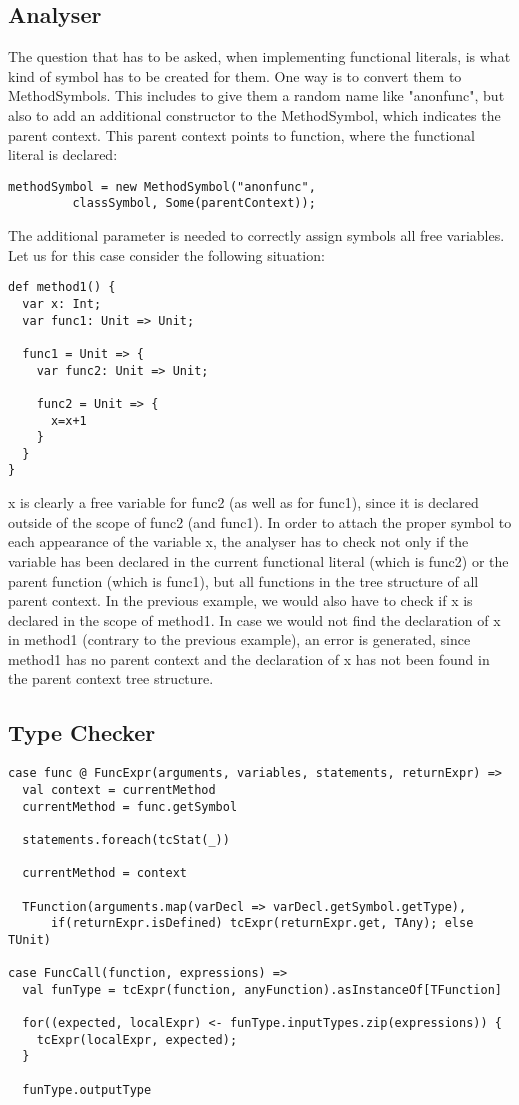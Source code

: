 \subsection{Analyser}
The question that has to be asked, when implementing functional literals, is what kind of symbol has to be created for them. One way is to convert them to MethodSymbols. This includes to give them a random name like "anonfunc", but also to add an additional constructor to the MethodSymbol, which indicates the parent context. This parent context points to function, where the functional literal is declared:
\begin{lstlisting}
methodSymbol = new MethodSymbol("anonfunc",
         classSymbol, Some(parentContext));
\end{lstlisting}
The additional parameter is needed to correctly assign symbols all free variables. Let us for this case consider the following situation:
\begin{lstlisting}
def method1() {
  var x: Int;
  var func1: Unit => Unit;

  func1 = Unit => {
    var func2: Unit => Unit;

    func2 = Unit => {
      x=x+1
    }
  }
}
\end{lstlisting}
x is clearly a free variable for func2 (as well as for func1), since it is declared outside of the scope of func2 (and func1). In order to attach the proper symbol to each appearance of the variable x, the analyser has to check not only if the variable has been declared in the current functional literal (which is func2) or the parent function (which is func1), but all functions in the tree structure of all parent context. In the previous example, we would also have to check if x is declared in the scope of method1. In case we would not find the declaration of x in method1 (contrary to the previous example), an error is generated, since method1 has no parent context and the declaration of x has not been found in the parent context tree structure.

\subsection{Type Checker}
\begin{lstlisting}
case func @ FuncExpr(arguments, variables, statements, returnExpr) =>
  val context = currentMethod
  currentMethod = func.getSymbol
          
  statements.foreach(tcStat(_))
          
  currentMethod = context
          
  TFunction(arguments.map(varDecl => varDecl.getSymbol.getType), 
      if(returnExpr.isDefined) tcExpr(returnExpr.get, TAny); else TUnit)
        
case FuncCall(function, expressions) =>
  val funType = tcExpr(function, anyFunction).asInstanceOf[TFunction]
          
  for((expected, localExpr) <- funType.inputTypes.zip(expressions)) {
    tcExpr(localExpr, expected);
  }
          
  funType.outputType
\end{lstlisting}

